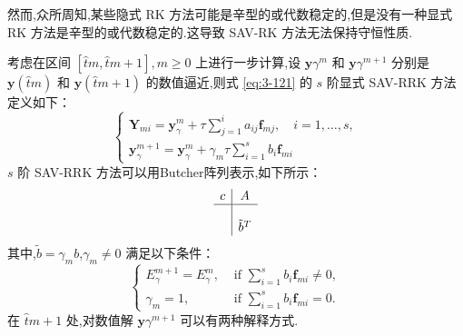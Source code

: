     然而,众所周知,某些隐式 RK 方法可能是辛型的或代数稳定的,但是没有一种显式 RK 方法是辛型的或代数稳定的.这导致 SAV-RK 方法无法保持守恒性质.
    
    考虑在区间 $\left[\hat{t}m, \hat{t}{m+1}\right], m \geq 0$ 上进行一步计算,设 $\bm{y}\gamma^m$ 和 $\bm{y}\gamma^{m+1}$ 分别是 $\bm{y}\left(\hat{t}m\right)$ 和 $\bm{y}\left(\hat{t}{m+1}\right)$ 的数值逼近,则式 \eqref{eq:3-121} 的 $s$ 阶显式 SAV-RRK 方法定义如下：
    \begin{equation}
	\left\{\begin{array}{l}
		\bm{Y}_{m i}=\bm{y}_\gamma^m+\tau \sum\limits_{j=1}^i a_{i j} \bm{f}_{m j}, \quad i=1, \ldots, s, \\
		\bm{y}_\gamma^{m+1}=\bm{y}_\gamma^m+\gamma_m \tau \sum\limits_{i=1}^s b_i \bm{f}_{m i}
	\end{array}\right.\label{eq:4-3}
	\end{equation}
$s$ 阶 SAV-RRK 方法可以用Butcher阵列表示,如下所示：
\begin{equation}
	\begin{array}{c|c}
	c & A \\
	\hline \\
	& \tilde{b}^T
	\end{array}
	\end{equation}
    其中,$\tilde{b}=\gamma_m b$,$\gamma_m\neq 0$ 满足以下条件：
\begin{equation}
	\left\{\begin{array}{ll}
	E_{\gamma}^{m+1}=E_{\gamma}^{m}, &\text { if } \sum\limits_{i=1}^s b_i \bm{f}_{m i} \neq 0,\\
	\gamma_m=1, &\text { if } \sum\limits_{i=1}^s b_i \bm{f}_{m i} =0.
	\end{array}\right.\label{eq:4-6}
	\end{equation}
    在 $\hat{t}{m+1}$ 处,对数值解 $\bm{y}\gamma^{m+1}$ 可以有两种解释方式.

